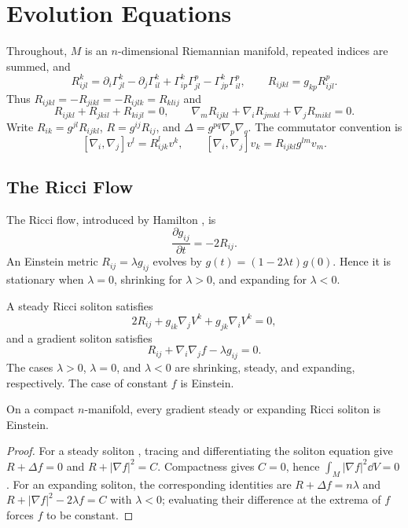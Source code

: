 \chapter{Evolution Equations}
\label{chap:cz-evolution-equations}

Throughout, $M$ is an $n$-dimensional Riemannian manifold, repeated
indices are summed, and
\[
R^k_{ijl}=\partial_i\Gamma^k_{jl}-\partial_j\Gamma^k_{il}
+\Gamma^k_{ip}\Gamma^p_{jl}-\Gamma^k_{jp}\Gamma^p_{il},\qquad
R_{ijkl}=g_{kp}R^p_{ijl}.
\]
Thus $R_{ijkl}=-R_{jikl}=-R_{ijlk}=R_{klij}$ and
\[
R_{ijkl}+R_{jkil}+R_{kijl}=0,\qquad
\nabla_mR_{ijkl}+\nabla_iR_{jmkl}+\nabla_jR_{mikl}=0.
\]
Write $R_{ik}=g^{jl}R_{ijkl}$, $R=g^{ij}R_{ij}$, and
$\Delta=g^{pq}\nabla_p\nabla_q$.  The commutator convention is
\[
[\nabla_i,\nabla_j]v^l=R^l_{ijk}v^k,\qquad
[\nabla_i,\nabla_j]v_k=R_{ijkl}g^{lm}v_m.
\]

\section{The Ricci Flow}

The Ricci flow, introduced by Hamilton \cite{Ha82}, is
\[
\frac{\partial g_{ij}}{\partial t}=-2R_{ij}.
\]
An Einstein metric $R_{ij}=\lambda g_{ij}$ evolves by
$g(t)=(1-2\lambda t)g(0)$.  Hence it is stationary when
$\lambda=0$, shrinking for $\lambda>0$, and expanding for
$\lambda<0$.

A steady Ricci soliton satisfies
\[
2R_{ij}+g_{ik}\nabla_jV^k+g_{jk}\nabla_iV^k=0,
\]
and a gradient soliton satisfies
\[
R_{ij}+\nabla_i\nabla_jf-\lambda g_{ij}=0.
\]
The cases $\lambda>0$, $\lambda=0$, and $\lambda<0$ are shrinking,
steady, and expanding, respectively.  The case of constant $f$ is
Einstein.

\begin{proposition}
  \label{prop:cz-compact-steady-and-expanding-gradient-solitons-are-einstein}
On a compact $n$-manifold, every gradient steady or expanding Ricci
soliton is Einstein.
\end{proposition}
\begin{proof}
\sketch For a steady soliton \cite{Ha95F, CK04}, tracing and differentiating the soliton
equation give $R+\Delta f=0$ and $R+|\nabla f|^2=C$.  Compactness
gives $C=0$, hence $\int_M|\nabla f|^2\dd V=0$.  For an expanding
soliton, the corresponding identities are
$R+\Delta f=n\lambda$ and $R+|\nabla f|^2-2\lambda f=C$ with
$\lambda<0$; evaluating their difference at the extrema of $f$
forces $f$ to be constant.
\end{proof}

